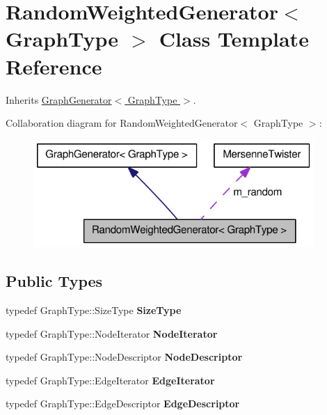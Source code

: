 \hypertarget{class_random_weighted_generator}{
\section{RandomWeightedGenerator$<$ GraphType $>$ Class Template Reference}
\label{class_random_weighted_generator}
}


Inherits \hyperlink{class_graph_generator}{GraphGenerator$<$ GraphType $>$}.



Collaboration diagram for RandomWeightedGenerator$<$ GraphType $>$:\nopagebreak
\begin{figure}[H]
\begin{center}
\leavevmode
\includegraphics[width=302pt]{class_random_weighted_generator__coll__graph}
\end{center}
\end{figure}
\subsection*{Public Types}
\begin{DoxyCompactItemize}
\item 
\hypertarget{class_random_weighted_generator_a2831b4e8794eb2eb29ea121cdbcf30e9}{
typedef GraphType::SizeType {\bfseries SizeType}}
\label{class_random_weighted_generator_a2831b4e8794eb2eb29ea121cdbcf30e9}

\item 
\hypertarget{class_random_weighted_generator_a44b245cefd468e7f22265395164033fd}{
typedef GraphType::NodeIterator {\bfseries NodeIterator}}
\label{class_random_weighted_generator_a44b245cefd468e7f22265395164033fd}

\item 
\hypertarget{class_random_weighted_generator_a537e0dc255a0216d07e39e6f40d2ef1e}{
typedef GraphType::NodeDescriptor {\bfseries NodeDescriptor}}
\label{class_random_weighted_generator_a537e0dc255a0216d07e39e6f40d2ef1e}

\item 
\hypertarget{class_random_weighted_generator_afdd7ccd2a962675f614760bec737051a}{
typedef GraphType::EdgeIterator {\bfseries EdgeIterator}}
\label{class_random_weighted_generator_afdd7ccd2a962675f614760bec737051a}

\item 
\hypertarget{class_random_weighted_generator_a944b0c46f80034e5c7c05e5bbcda0e67}{
typedef GraphType::EdgeDescriptor {\bfseries EdgeDescriptor}}
\label{class_random_weighted_generator_a944b0c46f80034e5c7c05e5bbcda0e67}

\end{DoxyCompactItemize}
